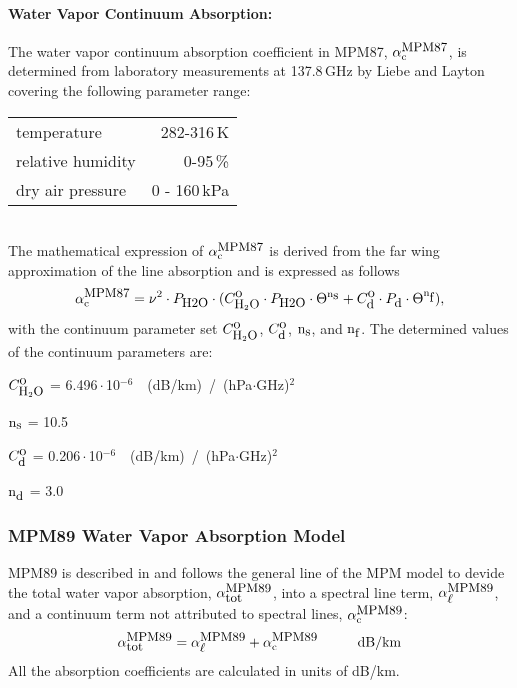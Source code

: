 \paragraph{Water Vapor Continuum Absorption:}
\label{levele:mpm87_h2ocont}
The water vapor continuum absorption coefficient in MPM87, $\alpha^{\mbox{\rm \small MPM87}}_{\rm c}$, 
is determined from laboratory measurements at 137.8\,GHz by Liebe 
and Layton covering the following parameter range:\\
\begin{tabular}{lr}
temperature          & 282-316\,K\\
relative humidity    & 0-95\,\%\\
dry air pressure     & 0 - 160\,kPa\\ 
\end{tabular}\\
The mathematical expression of $\alpha^{\mbox{\rm \small MPM87}}_{\rm c}$ is derived from the far wing 
approximation of the line absorption and is expressed as follows
\begin{equation} 
  \label{eq:mpm87:cont}
  \alpha^{\mbox{\rm \small MPM87}}_{\rm c} = \nu^2 \cdot P_{\mbox{\rm \small H2O}} \cdot 
                (C^{\mbox{\rm o}}_{\mbox{\rm \small H}_{2}\mbox{\rm \small O}} \cdot P_{\mbox{\rm \small H2O}} \cdot \Theta^{{\rm n}_{\mbox{\rm \small s}}} + 
                 C^{\mbox{\rm o}}_{\mbox{\rm \small d}} \cdot P_{\mbox{\rm \small d}}  \cdot \Theta^{{\rm n}_{\mbox{\rm \small f}}}),
\end{equation}
with the continuum parameter set $C^{\mbox{\rm o}}_{\mbox{\rm \small H}_{2}\mbox{\rm \small O}}$, $C^{\mbox{\rm o}}_{\mbox{\rm \small d}}$, ${\rm n}_{\mbox{\rm \small s}}$, and ${\rm n}_{\mbox{\rm \small f}}$. 
The determined values of the continuum parameters are:

\begin{description}
\item{$C^{\mbox{\rm o}}_{\mbox{\rm \small H}_{2}\mbox{\rm \small O}}$}   =  6.496\,$\cdot$\,10$^{-6}$~~(dB/km)~/~(hPa$\cdot$GHz)$^2$
\item{${\rm n}_{\mbox{\rm \small s}}$}    = 10.5
\item{$C^{\mbox{\rm o}}_{\mbox{\rm \small d}}$}   =  0.206\,$\cdot$\,10$^{-6}$~~(dB/km)~/~(hPa$\cdot$GHz)$^2$
\item{${\rm n}_{\mbox{\rm \small d}}$}    =  3.0
\end{description}




\subsubsection{MPM89 Water Vapor Absorption Model}
\label{leveld:mpm89}
%
MPM89 is described in \citet{liebe:89} and follows the general line 
of the MPM model to devide the total water vapor absorption, 
$\alpha^{\mbox{\rm \small MPM89}}_{\mbox{\small tot}}$, into a spectral line term, $\alpha^{\mbox{\rm \small MPM89}}_{\mbox{\small $\ell$}}$, and a continuum 
term not attributed to spectral lines, $\alpha^{\mbox{\rm \small MPM89}}_{\rm c}$:
\begin{equation}
  \label{eq:mpm89_abs}
  \alphampmmtot = \alphampmml + \alphampmmc\hspace*{10mm}\mbox{dB/km}
\end{equation}
All the absorption coefficients are calculated in units of \mbox{dB/km}.


